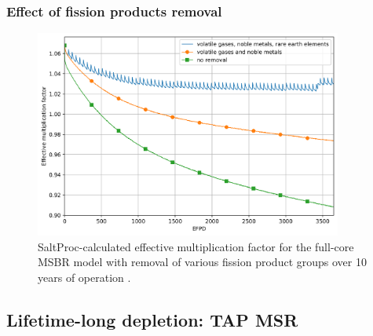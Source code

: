 \begin{frame}
\frametitle{Effect of fission products removal}       

\begin{figure}[t] %
	\centering
	\includegraphics[width=0.9\textwidth]{../dissertation/figures/ch3/keff_rem_cases.png}
	 
		\vspace{-3mm}
	\caption{SaltProc-calculated effective multiplication factor for the 
	full-core \gls{MSBR} model with removal of various fission product groups 
	over 10	years of operation \cite{rykhlevskii_modeling_2019}.}
\end{figure}

\end{frame}



\subsection{Lifetime-long depletion: \gls{TAP} MSR}

